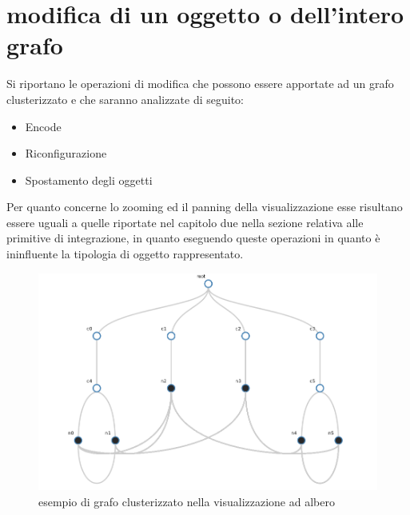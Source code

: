 {\section{modifica di un oggetto o dell'intero grafo}
Si riportano le operazioni di modifica che possono essere apportate ad un grafo clusterizzato e che saranno analizzate di seguito:
\begin{itemize}
	\item Encode
	\item Riconfigurazione
	\item Spostamento degli oggetti
\end{itemize}
Per quanto concerne lo zooming ed il panning della visualizzazione esse risultano essere uguali a quelle riportate nel capitolo due nella sezione relativa alle primitive di integrazione, in quanto eseguendo queste operazioni in quanto è ininfluente la tipologia di oggetto rappresentato.
\begin{figure}[!htb]
	\begin{center}
		\includegraphics[width=0.9 \linewidth]{figure/grafoAlbero}
	\end{center}
	\caption{esempio di grafo clusterizzato nella visualizzazione ad albero \label{fig:grafoAlbero}}
\end{figure}
}
